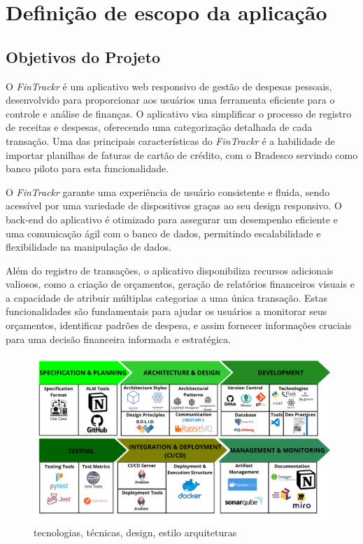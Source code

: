 \chapter{Definição de escopo da aplicação}

\section{Objetivos do Projeto}
O \textit{FinTrackr} é um aplicativo web responsivo de gestão de despesas pessoais, desenvolvido para proporcionar aos usuários uma ferramenta eficiente para o controle e análise de finanças. O aplicativo visa simplificar o processo de registro de receitas e despesas, oferecendo uma categorização detalhada de cada transação. Uma das principais características do \textit{FinTrackr} é a habilidade de importar planilhas de faturas de cartão de crédito, com o Bradesco servindo como banco piloto para esta funcionalidade.

O \textit{FinTrackr} garante uma experiência de usuário consistente e fluida, sendo acessível por uma variedade de dispositivos graças ao seu design responsivo. O back-end do aplicativo é otimizado para assegurar um desempenho eficiente e uma comunicação ágil com o banco de dados, permitindo escalabilidade e flexibilidade na manipulação de dados.

Além do registro de transações, o aplicativo disponibiliza recursos adicionais valiosos, como a criação de orçamentos, geração de relatórios financeiros visuais e a capacidade de atribuir múltiplas categorias a uma única transação. Estas funcionalidades são fundamentais para ajudar os usuários a monitorar seus orçamentos, identificar padrões de despesa, e assim fornecer informações cruciais para uma decisão financeira informada e estratégica.

\begin{figure}
	\centering
	\includegraphics[width=1\linewidth]{Textuais/images/FinTrackr.png}
	\caption{tecnologias, técnicas, design, estilo arquiteturas}
	\label{fig:fintrackr_technologies}
\end{figure}

